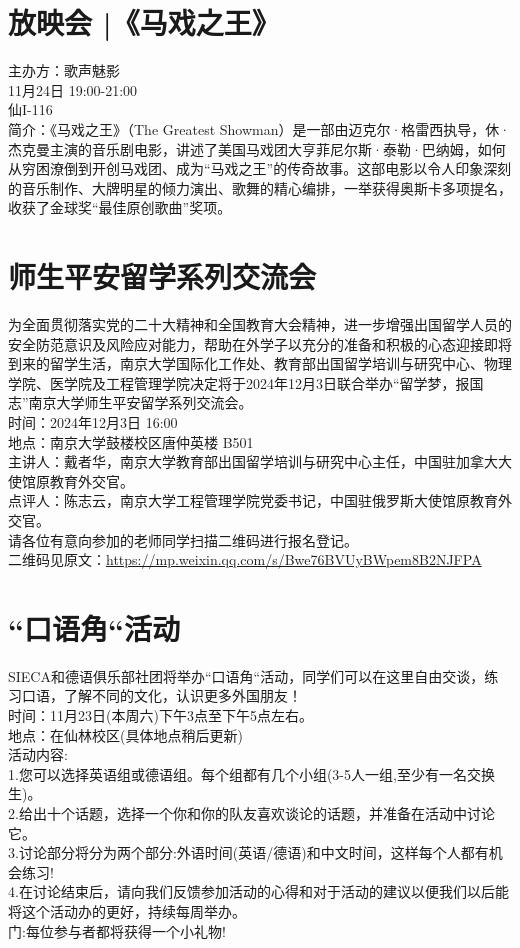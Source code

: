 \documentclass[letterpaper, 12pt]{article}
\begin{document}
\begin{multicols}{2}
\section{放映会 |《马戏之王》}
主办方：歌声魅影\\
11月24日 19:00-21:00\\
仙I-116\\
简介：《马戏之王》（The Greatest Showman）是一部由迈克尔·格雷西执导，休·杰克曼主演的音乐剧电影，讲述了美国马戏团大亨菲尼尔斯·泰勒·巴纳姆，如何从穷困潦倒到开创马戏团、成为“马戏之王”的传奇故事。这部电影以令人印象深刻的音乐制作、大牌明星的倾力演出、歌舞的精心编排，一举获得奥斯卡多项提名，收获了金球奖“最佳原创歌曲”奖项。

\section{师生平安留学系列交流会}
为全面贯彻落实党的二十大精神和全国教育大会精神，进一步增强出国留学人员的安全防范意识及风险应对能力，帮助在外学子以充分的准备和积极的心态迎接即将到来的留学生活，南京大学国际化工作处、教育部出国留学培训与研究中心、物理学院、医学院及工程管理学院决定将于2024年12月3日联合举办“留学梦，报国志”南京大学师生平安留学系列交流会。\\
时间：2024年12月3日 16:00\\
地点：南京大学鼓楼校区唐仲英楼 B501\\
主讲人：戴者华，南京大学教育部出国留学培训与研究中心主任，中国驻加拿大大使馆原教育外交官。\\
点评人：陈志云，南京大学工程管理学院党委书记，中国驻俄罗斯大使馆原教育外交官。\\
请各位有意向参加的老师同学扫描二维码进行报名登记。\\
二维码见原文：\url{https://mp.weixin.qq.com/s/Bwe76BVUyBWpem8B2NJFPA}

\section{“口语角“活动}
SIECA和德语俱乐部社团将举办“口语角“活动，同学们可以在这里自由交谈，练习口语，了解不同的文化，认识更多外国朋友！\\
时间：11月23日(本周六)下午3点至下午5点左右。\\
地点：在仙林校区(具体地点稍后更新)\\
活动内容:\\
1.您可以选择英语组或德语组。每个组都有几个小组(3-5人一组,至少有一名交换生)。\\
2.给出十个话题，选择一个你和你的队友喜欢谈论的话题，并准备在活动中讨论它。\\
3.讨论部分将分为两个部分:外语时间(英语/德语)和中文时间，这样每个人都有机会练习!\\
4.在讨论结束后，请向我们反馈参加活动的心得和对于活动的建议以便我们以后能将这个活动办的更好，持续每周举办。\\
门:每位参与者都将获得一个小礼物!


\end{multicols}
\end{document}
